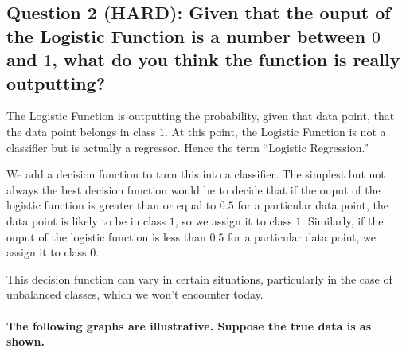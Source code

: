 \documentclass[11pt]{article}
\begin{document}
    \hypertarget{question-2-hard-given-that-the-ouput-of-the-logistic-function-is-a-number-between-0-and-1-what-do-you-think-the-function-is-really-outputting}{%
\subsection{\texorpdfstring{Question 2 (HARD): Given that the ouput of
the Logistic Function is a number between \(0\) and \(1\), what do you
think the function is really
outputting?}{Question 2 (HARD): Given that the ouput of the Logistic Function is a number between 0 and 1, what do you think the function is really outputting?}}\label{question-2-hard-given-that-the-ouput-of-the-logistic-function-is-a-number-between-0-and-1-what-do-you-think-the-function-is-really-outputting}}

    The Logistic Function is outputting the probability, given that data
point, that the data point belongs in class \(1\). At this point, the
Logistic Function is not a classifier but is actually a regressor. Hence
the term ``Logistic Regression.''

We add a decision function to turn this into a classifier. The simplest
but not always the best decision function would be to decide that if the
ouput of the logistic function is greater than or equal to \(0.5\) for a
particular data point, the data point is likely to be in class \(1\), so
we assign it to class \(1\). Similarly, if the ouput of the logistic
function is less than \(0.5\) for a particular data point, we assign it
to class \(0\).

This decision function can vary in certain situations, particularly in
the case of unbalanced classes, which we won't encounter today.

    \hypertarget{the-following-graphs-are-illustrative.-suppose-the-true-data-is-as-shown.}{%
\paragraph{The following graphs are illustrative. Suppose the true data
is as
shown.}\label{the-following-graphs-are-illustrative.-suppose-the-true-data-is-as-shown.}}
\end{document}

